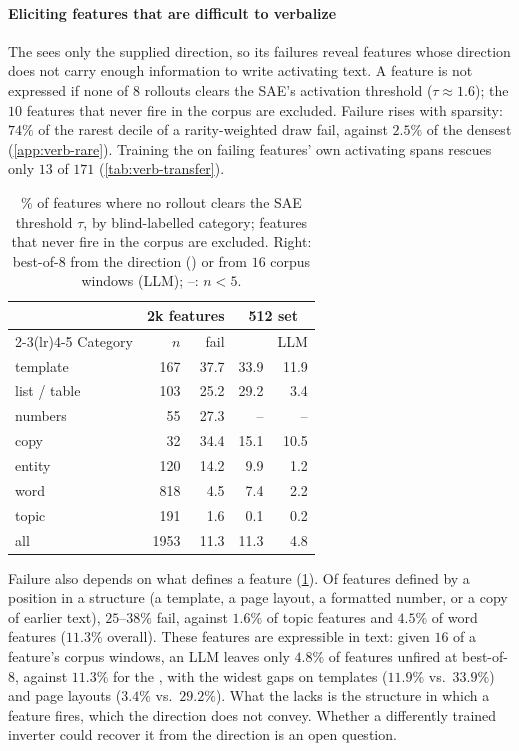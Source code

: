 \paragraph{Eliciting features that are difficult to verbalize}
\label{sec:expressibility}

The \method{} sees only the supplied direction, so its failures reveal features whose direction
does not carry enough information to write activating text. A feature is not expressed if none of
$8$ rollouts clears the SAE's activation threshold ($\tau{\approx}1.6$); the $10$ features that
never fire in the corpus are excluded. Failure rises with sparsity: $74\%$ of the rarest decile of
a rarity-weighted draw fail, against $2.5\%$ of the densest (\cref{app:verb-rare}). Training the
\method{} on failing features' own activating spans rescues only $13$ of $171$
(\cref{tab:verb-transfer}).

\begin{table}[H]
\centering
\footnotesize
\setlength{\tabcolsep}{4pt}
\begin{tabular}{lrrrr}
\toprule
& \multicolumn{2}{c}{2k features} & \multicolumn{2}{c}{512 set} \\
\cmidrule(lr){2-3}\cmidrule(lr){4-5}
Category & $n$ & fail & \method{} & LLM \\
\midrule
template     & 167 & 37.7 & 33.9 & 11.9 \\
list / table & 103 & 25.2 & 29.2 &  3.4 \\
numbers      &  55 & 27.3 &   -- &   -- \\
copy         &  32 & 34.4 & 15.1 & 10.5 \\
\midrule
entity       & 120 & 14.2 &  9.9 &  1.2 \\
word         & 818 &  4.5 &  7.4 &  2.2 \\
topic        & 191 &  1.6 &  0.1 &  0.2 \\
\midrule
all          & 1953 & 11.3 & 11.3 &  4.8 \\
\bottomrule
\end{tabular}
\caption{\% of features where no rollout clears the SAE threshold $\tau$, by blind-labelled
category; features that never fire in the corpus are excluded. Right: best-of-$8$ from the
direction (\method{}) or from $16$ corpus windows (LLM); --: $n<5$.}
\label{tab:verb-taxonomy}
\end{table}

Failure also depends on what defines a feature (\cref{tab:verb-taxonomy}). Of features defined by
a position in a structure (a template, a page layout, a formatted number, or a copy of earlier
text), $25$--$38\%$ fail, against $1.6\%$ of topic features and $4.5\%$ of word features ($11.3\%$
overall). These features are expressible in text: given $16$ of a feature's corpus windows, an LLM
leaves only $4.8\%$ of features unfired at best-of-$8$, against $11.3\%$ for the \method{}, with the
widest gaps on templates ($11.9\%$ vs.\ $33.9\%$) and page layouts ($3.4\%$ vs.\ $29.2\%$). What
the \method{} lacks is the structure in which a feature fires, which the direction does not convey.
Whether a differently trained inverter could recover it from the direction is an open question.
